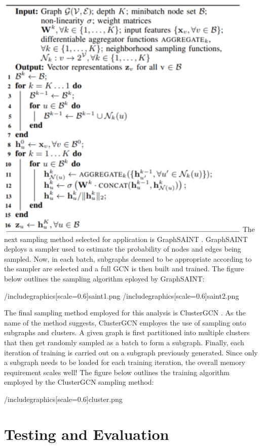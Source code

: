 \documentclass{article}
\begin{document}
	\includegraphics[scale=0.6]{sage.png} 
	The next sampling method selected for application is GraphSAINT \cite{graphsaint-iclr20}. GraphSAINT deploys a sampler used to estimate the probability of nodes and edges being sampled. Now, in each batch, subgraphs deemed to be appropriate according to the sampler are selected and a full GCN is then built and trained.
	The figure below outlines the sampling algorithm eployed by GraphSAINT:

	/includegraphics[scale=0.6]{saint1.png}
	/includegraphics[scale=0.6]{saint2.png}
	
	The final sampling method employed for this analysis is ClusterGCN \cite{2019}. As the name of the method suggests, ClusterGCN employes the use of sampling onto subgraphs and clusters. A given graph is first partitioned into multiple clusters that then get randomly sampled as a batch to form a subgraph. Finally, each iteration of training is carried out on a subgraph previously generated. Since only a subgraph needs to be loaded for each training iteration, the overall memory requirement scales well!
	The figure below outlines the training algorithm employed by the ClusterGCN sampling method:
	
	/includegraphics[scale=0.6]{cluster.png}
	
	\section{Testing and Evaluation}
	
\end{document}

